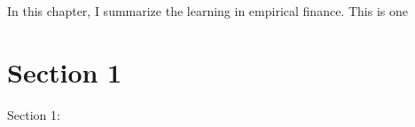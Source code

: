 \minitoc

\vspace{0.5cm}

In this chapter, I summarize the learning in empirical finance.
This is one 

\section{Section 1}
Section 1: